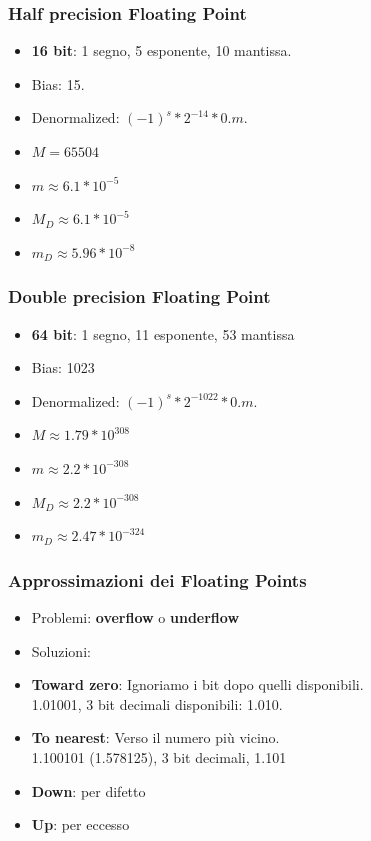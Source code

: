 \documentclass{report}
\begin{document}
        \subsubsection{Half precision Floating Point}
        \begin{itemize}
            \item \textbf{16 bit}: 1 segno, 5 esponente, 10 mantissa.
            \item Bias: 15.
            \item Denormalized: $(-1)^s * 2^{-14} * 0.m$.
            \item $M = 65504$
            \item $m \approx 6.1 * 10^{-5}$
            \item $M_D \approx 6.1 * 10^{-5}$
            \item $m_D \approx 5.96 * 10^{-8}$
        \end{itemize}
        \subsubsection{Double precision Floating Point}
        \begin{itemize}
            \item \textbf{64 bit}: 1 segno, 11 esponente, 53 mantissa
            \item Bias: 1023
            \item Denormalized: $(-1)^s * 2^{-1022} * 0.m$.
            \item $M \approx 1.79 * 10^{308}$
            \item $m \approx 2.2 * 10^{-308}$
            \item $M_D \approx 2.2 * 10^{-308}$
            \item $m_D \approx 2.47 * 10^{-324}$
        \end{itemize}
        \subsubsection{Approssimazioni dei Floating Points} %
        \begin{itemize}                                 %
            \item Problemi: \textbf{overflow} o \textbf{underflow}
            \item Soluzioni:
                \item \textbf{Toward zero}: 
                    Ignoriamo i bit dopo quelli disponibili. \\
                    1.01001, 3 bit decimali disponibili: 1.010.
                \item \textbf{To nearest}: 
                    Verso il numero più vicino. \\
                    1.100101 (1.578125), 3 bit decimali, 1.101
                \item \textbf{Down}:
                    per difetto
                \item \textbf{Up}:
                    per eccesso
        \end{itemize}
\end{document}
